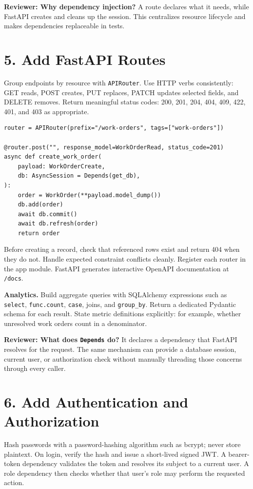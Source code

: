 \documentclass[10pt]{article}
\begin{document}
\textbf{Reviewer: Why dependency injection?} A route declares what it needs, while FastAPI creates and cleans up the session. This centralizes resource lifecycle and makes dependencies replaceable in tests.

\section{5. Add FastAPI Routes}
Group endpoints by resource with \texttt{APIRouter}. Use HTTP verbs consistently: GET reads, POST creates, PUT replaces, PATCH updates selected fields, and DELETE removes. Return meaningful status codes: 200, 201, 204, 404, 409, 422, 401, and 403 as appropriate.
\begin{lstlisting}
router = APIRouter(prefix="/work-orders", tags=["work-orders"])

@router.post("", response_model=WorkOrderRead, status_code=201)
async def create_work_order(
    payload: WorkOrderCreate,
    db: AsyncSession = Depends(get_db),
):
    order = WorkOrder(**payload.model_dump())
    db.add(order)
    await db.commit()
    await db.refresh(order)
    return order
\end{lstlisting}
Before creating a record, check that referenced rows exist and return 404 when they do not. Handle expected constraint conflicts cleanly. Register each router in the app module. FastAPI generates interactive OpenAPI documentation at \texttt{/docs}.

\textbf{Analytics.} Build aggregate queries with SQLAlchemy expressions such as \texttt{select}, \texttt{func.count}, \texttt{case}, joins, and \texttt{group\_by}. Return a dedicated Pydantic schema for each result. State metric definitions explicitly: for example, whether unresolved work orders count in a denominator.

\textbf{Reviewer: What does \texttt{Depends} do?} It declares a dependency that FastAPI resolves for the request. The same mechanism can provide a database session, current user, or authorization check without manually threading those concerns through every caller.

\section{6. Add Authentication and Authorization}
Hash passwords with a password-hashing algorithm such as bcrypt; never store plaintext. On login, verify the hash and issue a short-lived signed JWT. A bearer-token dependency validates the token and resolves its subject to a current user. A role dependency then checks whether that user's role may perform the requested action.
\end{document}
